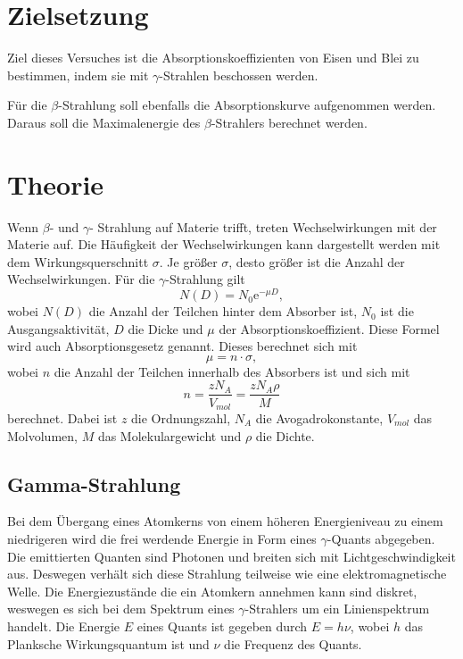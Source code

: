 \section{Zielsetzung}
\label{sec:Zielsetzung}
Ziel dieses Versuches ist die Absorptionskoeffizienten von Eisen und Blei zu bestimmen, indem sie mit $\gamma$-Strahlen beschossen werden.

Für die $\beta$-Strahlung soll ebenfalls die Absorptionskurve aufgenommen werden. Daraus soll die Maximalenergie des $\beta$-Strahlers berechnet werden.

\section{Theorie}
\label{sec:Theorie}
Wenn $\beta$- und $\gamma$- Strahlung auf Materie trifft, treten Wechselwirkungen mit der Materie auf.
Die Häufigkeit der Wechselwirkungen kann dargestellt werden mit dem Wirkungsquerschnitt $\sigma$.
Je größer $\sigma$, desto größer ist die Anzahl der Wechselwirkungen.
Für die $\gamma$-Strahlung gilt
\begin{equation}
    N(D) = N_0 \text{e}^{-\mu D},
    \label{eqn:Absorptionsgesetz}
\end{equation}
wobei $N(D)$ die Anzahl der Teilchen hinter dem Absorber ist, $N_0$ ist die Ausgangsaktivität, $D$ die Dicke und $\mu$ der Absorptionskoeffizient.
Diese Formel wird auch Absorptionsgesetz genannt.
Dieses berechnet sich mit
\begin{equation}
    \mu = n \cdot \sigma ,
    \label{eqn:Absorbitionskoeffizienten}
\end{equation}
wobei $n$ die Anzahl der Teilchen innerhalb des Absorbers ist und sich mit
\begin{equation}
    n = \frac{z N_A}{V_{mol}} =\frac{z N_A \rho}{M}
    \label{eqn:AninAb}
\end{equation} 
berechnet. Dabei ist $z$ die Ordnungszahl, $N_A$ die Avogadrokonstante, $V_{mol}$ das Molvolumen, $M$ das Molekulargewicht und $\rho$ die Dichte.

\subsection{Gamma-Strahlung} %
\label{sub:gamma-Strahlung}
Bei dem Übergang eines Atomkerns von einem höheren Energieniveau zu einem niedrigeren wird die frei werdende Energie in Form eines $\gamma$-Quants abgegeben.
Die emittierten Quanten sind Photonen und breiten sich mit Lichtgeschwindigkeit aus.
Deswegen verhält sich diese Strahlung teilweise wie eine elektromagnetische Welle.
Die Energiezustände die ein Atomkern annehmen kann sind diskret, weswegen es sich bei dem Spektrum eines $\gamma$-Strahlers um ein Linienspektrum handelt.
Die Energie $E$ eines Quants ist gegeben durch $E =h \nu$, wobei $h$ das Planksche Wirkungsquantum ist und $\nu$ die Frequenz des Quants.\\
